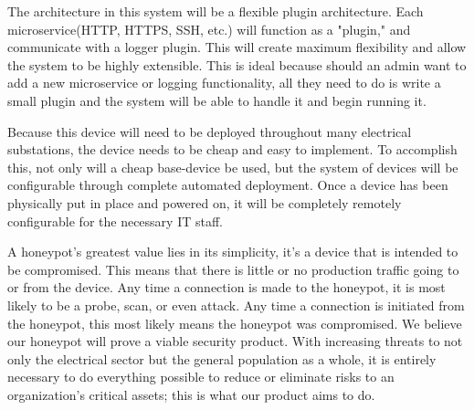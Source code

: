 The architecture in this system will be a flexible plugin architecture. Each microservice(HTTP, HTTPS, SSH, etc.) will function as a "plugin," and communicate with a logger plugin. This will create maximum flexibility and allow the system to be highly extensible. This is ideal because should an admin want to add a new microservice or logging functionality, all they need to do is write a small plugin and the system will be able to handle it and begin running it.

Because this device will need to be deployed throughout many electrical substations, the device needs to be cheap and easy to implement. To accomplish this, not only will a cheap base-device be used, but the system of devices will be configurable through complete automated deployment. Once a device has been physically put in place and powered on, it will be completely remotely configurable for the necessary IT staff.

A honeypot's greatest value lies in its simplicity, it's a device that is intended to be compromised. This means that there is little or no production traffic going to or from the device. Any time a connection is made to the honeypot, it is most likely to be a probe, scan, or even attack. Any time a connection is initiated from the honeypot, this most likely means the honeypot was compromised. We believe our honeypot will prove a viable security product. With increasing threats to not only the electrical sector but the general population as a whole, it is entirely necessary to do everything possible to reduce or eliminate risks to an organization's critical assets; this is what our product aims to do.
